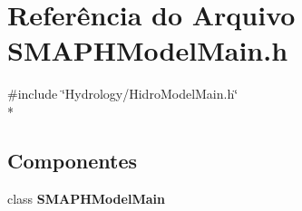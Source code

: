 \section{Referência do Arquivo S\+M\+A\+P\+H\+Model\+Main.\+h}
\label{_s_m_a_p_h_model_main_8h}
{\ttfamily \#include \char`\"{}Hydrology/\+Hidro\+Model\+Main.\+h\char`\"{}}\\*
\subsection*{Componentes}
\begin{DoxyCompactItemize}
\item 
class {\bf S\+M\+A\+P\+H\+Model\+Main}
\end{DoxyCompactItemize}
